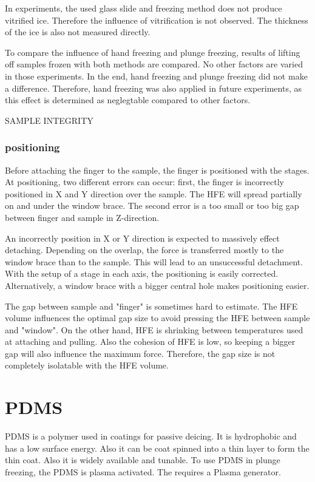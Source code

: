 In experiments, the used glass slide and freezing method does not produce vitrified ice. Therefore the influence of vitrification is not observed. The thickness of the ice is also not measured directly. 

To compare the influence of hand freezing and plunge freezing, results of lifting off samples frozen with both methods are compared. No other factors are varied in those experiments. In the end, hand freezing and plunge freezing did not make a difference. Therefore, hand freezing was also applied in future experiments, as this effect is determined as neglegtable compared to other factors.

SAMPLE INTEGRITY

\subsubsection{positioning}
\label{section:positioning}

Before attaching the finger to the sample, the finger is positioned with the stages. At positioning, two different errors can occur: first, the finger is incorrectly positioned in X and Y direction over the sample. The HFE will spread partially on and under the window brace. The second error is a too small or too big gap between finger and sample in Z-direction. 

An incorrectly position in X or Y direction is expected to massively effect detaching. Depending on the overlap, the force is transferred mostly to the window brace than to the sample. This will lead to an unsuccessful detachment. With the setup of a stage in each axis, the positioning is easily corrected. Alternatively, a window brace with a bigger central hole makes positioning easier.

The gap between sample and "finger" is sometimes hard to estimate. The HFE volume influences the optimal gap size to avoid pressing the HFE between sample and "window". On the other hand, HFE is shrinking between temperatures used at attaching and pulling. Also the cohesion of HFE is low, so keeping a bigger gap will also influence the maximum force. Therefore, the gap size is not completely isolatable with the HFE volume.

\section{PDMS}

PDMS is a polymer used in coatings for passive deicing. It is hydrophobic and has a low surface energy. Also it can be coat spinned into a thin layer to form the thin coat. Also it is widely available and tunable. To use PDMS in plunge freezing, the PDMS is plasma activated. The requires a Plasma generator.

